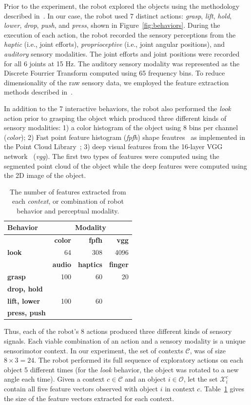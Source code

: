 Prior to the experiment, the robot explored the objects using the methodology described in~\cite{sinapov:ras14}.
In our case, the robot used 7 distinct actions: {\it grasp}, {\it lift}, {\it hold}, {\it lower}, {\it drop}, {\it push}, and {\it press}, shown in Figure~\ref{fig:behaviors}.
During the execution of each action, the robot recorded the sensory perceptions from the {\it haptic} (i.e., joint efforts), {\it proprioceptive} (i.e., joint angular positions), and {\it auditory} sensory modalities.
The joint efforts and joint positions were recorded for all 6 joints at 15 Hz.
The auditory sensory modality was represented as the Discrete Fourrier Transform computed using 65 frequency bins.
To reduce dimensionality of the raw sensory data, we employed the feature extraction methods described in~\cite{sinapov:ras14}. 

In addition to the 7 interactive behaviors, the robot also performed the {\it look} action prior to grasping the object which produced three different kinds of sensory modalities: 1) a color histogram of the object using 8 bins per channel ({\it color}); 2) Fast point feature histogram ({\it fpfh}) shape feautres~\cite{rusu:icra09} as implemented in the Point Cloud Library~\cite{aldoma:ram12}; 3) deep visual features from the 16-layer VGG network~\cite{simonyan:corr14} ({\it vgg}).
The first two types of features were computed using the segmented point cloud of the object while the deep features were computed using the 2D image of the object. 

\begin{table}
\centering
\begin{tabular}[h]{|l|r|r|r|}
	\hline
	\bf Behavior & \multicolumn{3}{c|}{\bf Modality} \\ \hline \hline
	& \bf color & \bf fpfh & \bf vgg \\ \hline
	\bf look & 64 & 308 & 4096 \\ \hline \hline
	& \bf audio & \bf haptics & \bf finger \\ \hline
	\bf grasp & 100 & 60 & 20 \\ \hline
	\bf drop, hold & & & \\
	\bf lift, lower & 100 & 60 & \\
	\bf press, push & & & \\ \hline
\end{tabular}
\caption{The number of features extracted from each \textit{context}, or combination of robot behavior and perceptual modality.}
\label{tab:feature_space_of_contexts}
\end{table}

Thus, each of the robot's 8 actions produced three different kinds of sensory signals.
Each viable combination of an action and a sensory modality is a unique sensorimotor context.
In our experiment, the set of contexts $\mathcal{C}$, was of size  $8 \times 3 = 24$.
The robot performed its full sequence of exploratory actions on each object 5 different times (for the {\it look} behavior, the object was rotated to a new angle each time). Given a context $c \in \mathcal{C}$ and an object $i \in \mathcal{O}$, let the set $\mathcal{X}_i^c$ contain all five feature vectors observed with object $i$ in context $c$.
Table~\ref{tab:feature_space_of_contexts} gives the size of the feature vectors extracted for each context.